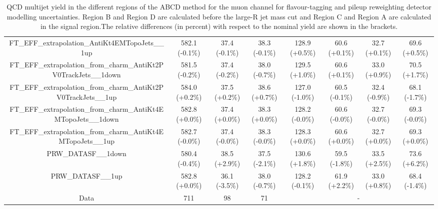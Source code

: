 \begin{table}[htbp!]
\begin{tiny}
\begin{center}
\begin{tabular}{c|c|c|c||c|c|c|c}
FT\_EFF\_extrapolation\_AntiKt4EMTopoJets\_\_1up             & 582.1     (-0.1\%) & 37.4      (-0.1\%) & 38.3      (-0.1\%) & 128.9     (+0.5\%) & 60.6      (+0.1\%) & 32.7      (+0.1\%) & 69.6      (+0.5\%) \\ 
FT\_EFF\_extrapolation\_from\_charm\_AntiKt2PV0TrackJets\_\_1down & 581.5     (-0.2\%) & 37.4      (-0.2\%) & 38.0      (-0.7\%) & 129.5     (+1.0\%) & 60.6      (+0.1\%) & 33.0      (+0.9\%) & 70.5      (+1.7\%) \\ 
FT\_EFF\_extrapolation\_from\_charm\_AntiKt2PV0TrackJets\_\_1up & 584.0     (+0.2\%) & 37.5      (+0.2\%) & 38.6      (+0.7\%) & 127.0     (-1.0\%) & 60.5      (-0.1\%) & 32.4      (-0.9\%) & 68.1      (-1.7\%) \\ 
FT\_EFF\_extrapolation\_from\_charm\_AntiKt4EMTopoJets\_\_1down & 582.8     (+0.0\%) & 37.4      (+0.0\%) & 38.3      (+0.0\%) & 128.2     (-0.0\%) & 60.6      (-0.0\%) & 32.7      (-0.0\%) & 69.3      (-0.0\%) \\ 
FT\_EFF\_extrapolation\_from\_charm\_AntiKt4EMTopoJets\_\_1up & 582.7     (-0.0\%) & 37.4      (-0.0\%) & 38.3      (-0.0\%) & 128.3     (+0.0\%) & 60.6      (+0.0\%) & 32.7      (+0.0\%) & 69.3      (+0.0\%) \\ 
PRW\_DATASF\_\_1down                                         & 580.4     (-0.4\%) & 38.5      (+2.9\%) & 37.5      (-2.1\%) & 130.6     (+1.8\%) & 59.5      (-1.8\%) & 33.5      (+2.5\%) & 73.6      (+6.2\%) \\ 
PRW\_DATASF\_\_1up                                           & 582.8     (+0.0\%) & 36.1      (-3.5\%) & 38.0      (-0.7\%) & 128.2     (-0.1\%) & 61.9      (+2.2\%) & 33.0      (+0.8\%) & 68.4      (-1.4\%) \\ 
\hline 
\hline 
Data                                                        & 711  & 98   & 71   &\multicolumn{4}{c}{-} \\ 
\hline
\end{tabular}
\end{center}
\caption{QCD multijet yield in the different regions of the ABCD method for the muon channel for flavour-tagging and pileup reweighting 
detector modelling uncertainties. Region B and Region D are calculated before the large-R jet mass cut and Region C and Region A are 
calculated in the signal region.The relative differences (in percent) with respect to the nominal yield are shown in the brackets.} 
\label{tab:boosted_qcd_detsyst_muon_sr_2}
\end{tiny}
\end{table} 
